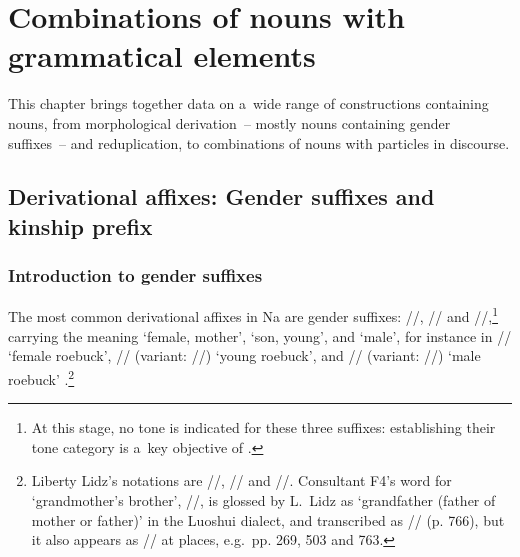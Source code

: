 \chapter{Combinations of nouns with grammatical elements}
\label{chap:combinationsofnounswithgrammaticalwords}

This chapter brings together data on a~wide range of constructions containing nouns, from morphological derivation~-- mostly nouns containing gender suffixes~-- and {reduplication}, to combinations of nouns with particles in discourse. 


\section{Derivational affixes: Gender suffixes and kinship prefix}
\label{sec:thegendersuffixes}
\subsection{Introduction to gender suffixes}
\label{sec:thegendersuffixesintro}

The most common derivational affixes in Na are gender suffixes: //, // and //,\footnote{At this stage, no tone is indicated for these three suffixes: establishing their tone category is a~key objective of .} carrying
the meaning ‘female, mother’, ‘son, young’, and ‘male’, for instance in //
‘female roebuck’, // ({variant}: //) ‘young roebuck’, and //
({variant}: //) ‘male roebuck’ \citep[177-179]{lidz2010}.\footnote{Liberty Lidz's notations are //, // and //. Consultant F4's word for ‘grandmother's brother’, //, is glossed by L.~Lidz as ‘grandfather (father of mother or father)’ in the Luoshui dialect, and transcribed as // (p. 766), but it also appears as // at places, e.g.~pp. 269, 503 and 763.}

